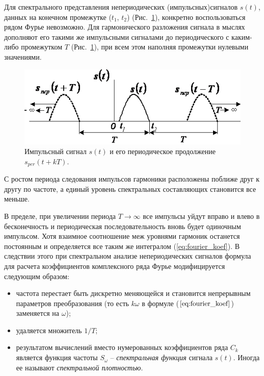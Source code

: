 \documentclass[12pt,a4paper]{article}
\begin{document}
Для спектрального представления непериодических (импульсных)\linebreak сигналов $s\left(t\right)$, данных на конечном промежутке ($t_1$, $t_2$) (Рис.~\ref{img:f_trans}), конкретно воспользоваться рядом Фурье невозможно. Для гармонического разложения сигнала в мыслях дополняют его такими же импульсными сигналами до периодического с каким-либо промежутком $T$ (Рис.~\ref{img:f_trans}), при всем этом наполняя промежутки нулевыми значениями.

\begin{figure}[H]
\includegraphics[width=\linewidth]{f_trans}
\caption{Импульсный сигнал $s\left( t\right)$ и его периодическое продолжение $s_{per}\left( t+kT\right)$.}\label{img:f_trans}
\end{figure}

С ростом периода следования импульсов гармоники расположены поближе друг к другу по частоте, а единый уровень спектральных составляющих становится все меньше. 

В пределе, при увеличении периода $T\rightarrow\infty$ все импульсы уйдут вправо и влево в бесконечность и периодическая последовательность вновь будет одиночным импульсом. Хотя взаимное соотношение меж уровнями гармоник останется постоянным и определяется все таким же интегралом (\ref{eq:fourier_koef}). В следствии этого при спектральном анализе непериодических сигналов формула для расчета коэффициентов комплексного ряда Фурье модифицируется следующим образом:

\begin{itemize}
\item частота перестает быть дискретно меняющейся и становится непрерывным параметров преобразования (то есть $k\omega$ в формуле ($\ref{eq:fourier_koef}$) заменяется на $\omega$);
\item удаляется множитель $1/T$;
\item результатом вычислений вместо нумерованных коэффициентов ряда $C_k$ является функция частоты $S_\omega$ -- \emph{спектральная функция} сигнала $s\left(t\right)$. Иногда ее называют \emph{спектральной плотностью}.
\end{itemize}
\end{document}
